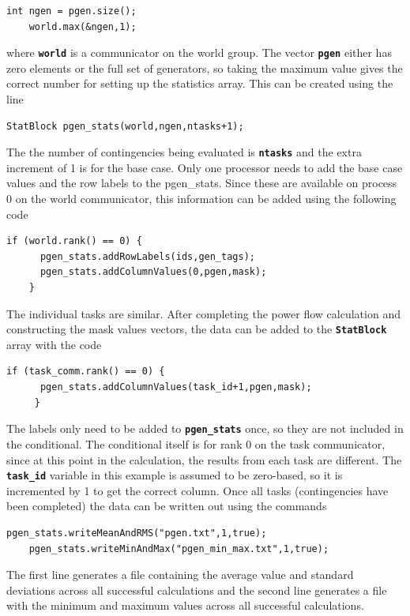 {
\color{red}
\begin{Verbatim}[fontseries=b]
    int ngen = pgen.size();
    world.max(&ngen,1);
\end{Verbatim}
}

where \texttt{\textbf{world}} is a communicator on the world group. The vector \texttt{\textbf{pgen}} either has zero elements or the full set of generators, so taking the maximum value gives the correct number for setting up the statistics array. This can be created using the line

{
\color{red}
\begin{Verbatim}[fontseries=b]
    StatBlock pgen_stats(world,ngen,ntasks+1);
\end{Verbatim}
}

The the number of contingencies being evaluated is \texttt{\textbf{ntasks}} and the extra increment of 1 is for the base case. Only one processor needs to add the base case values and the row labels to the pgen\_stats. Since these are available on process 0 on the world communicator, this information can be added using the following code

{
\color{red}
\begin{Verbatim}[fontseries=b]
    if (world.rank() == 0) {
      pgen_stats.addRowLabels(ids,gen_tags);
      pgen_stats.addColumnValues(0,pgen,mask);
    }
\end{Verbatim}
}

The individual tasks are similar. After completing the power flow calculation and constructing the mask values vectors, the data can be added to the \texttt{\textbf{StatBlock}} array with the code

{
\color{red}
\begin{Verbatim}[fontseries=b]
     if (task_comm.rank() == 0) {
      pgen_stats.addColumnValues(task_id+1,pgen,mask);
     }
\end{Verbatim}
}

The labels only need to be added to \texttt{\textbf{pgen\_stats}} once, so they are not included in the conditional. The conditional itself is for rank 0 on the task communicator, since at this point in the calculation, the results from each task are different. The \texttt{\textbf{task\_id}} variable in this example is assumed to be zero-based, so it is incremented by 1 to get the correct column.
Once all tasks (contingencies have been completed) the data can be written out using the commands

{
\color{red}
\begin{Verbatim}[fontseries=b]
    pgen_stats.writeMeanAndRMS("pgen.txt",1,true);
    pgen_stats.writeMinAndMax("pgen_min_max.txt",1,true);
\end{Verbatim}
}

The first line generates a file containing the average value and standard deviations across all successful calculations and the second line generates a file with the minimum and maximum values across all successful calculations.
